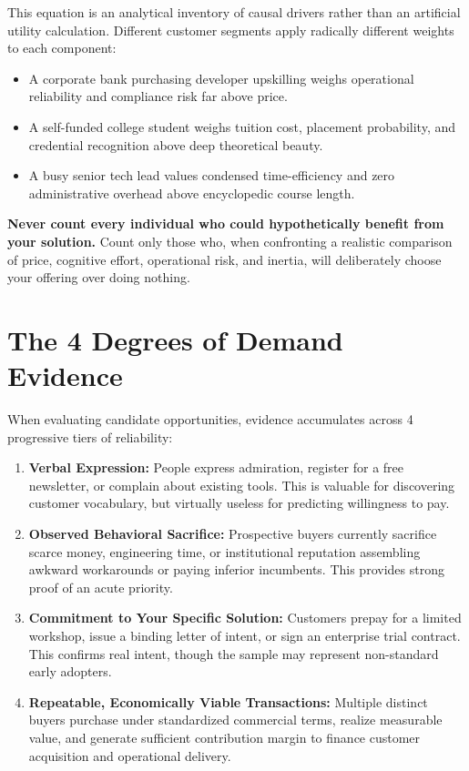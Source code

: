 This equation is an analytical inventory of causal drivers rather than an artificial utility calculation. Different customer segments apply radically different weights to each component:
\begin{itemize}[leftmargin=12pt,itemsep=1pt,topsep=1pt]
  \item A corporate bank purchasing developer upskilling weighs operational reliability and compliance risk far above price.
  \item A self-funded college student weighs tuition cost, placement probability, and credential recognition above deep theoretical beauty.
  \item A busy senior tech lead values condensed time-efficiency and zero administrative overhead above encyclopedic course length.
\end{itemize}

\textbf{Never count every individual who could hypothetically benefit from your solution.} Count only those who, when confronting a realistic comparison of price, cognitive effort, operational risk, and inertia, will deliberately choose your offering over doing nothing.

\section{The 4 Degrees of Demand Evidence}

When evaluating candidate opportunities, evidence accumulates across 4 progressive tiers of reliability:

\begin{enumerate}[leftmargin=14pt,itemsep=3pt,topsep=2pt]
  \item \textbf{Verbal Expression:} People express admiration, register for a free newsletter, or complain about existing tools. This is valuable for discovering customer vocabulary, but virtually useless for predicting willingness to pay.
  \item \textbf{Observed Behavioral Sacrifice:} Prospective buyers currently sacrifice scarce money, engineering time, or institutional reputation assembling awkward workarounds or paying inferior incumbents. This provides strong proof of an acute priority.
  \item \textbf{Commitment to Your Specific Solution:} Customers prepay for a limited workshop, issue a binding letter of intent, or sign an enterprise trial contract. This confirms real intent, though the sample may represent non-standard early adopters.
  \item \textbf{Repeatable, Economically Viable Transactions:} Multiple distinct buyers purchase under standardized commercial terms, realize measurable value, and generate sufficient contribution margin to finance customer acquisition and operational delivery.
\end{enumerate}

